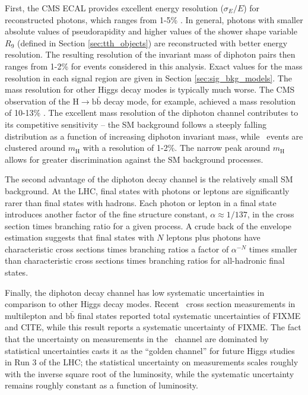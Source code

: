 First, the CMS ECAL provides excellent energy resolution ($\sigma_E/E$) for reconstructed photons, which ranges from 1-5\% \cite{Chatrchyan:2013dga}.
In general, photons with smaller absolute values of pseudorapidity and higher values of the shower shape variable $R_9$ (defined in Section \ref{sec:tth_objects}) are reconstructed with better energy resolution.
The resulting resolution of the invariant mass of diphoton pairs then ranges from 1-2\% for events considered in this analysis.
Exact values for the mass resolution in each signal region are given in Section \ref{sec:sig_bkg_models}.
The mass resolution for other Higgs decay modes is typically much worse.
The CMS observation of the $\text{H} \to \text{b}\bar{\text{b}}$ decay mode, for example, achieved a mass resolution of 10-13\% \cite{Hbb_obs}.
The excellent mass resolution of the diphoton channel contributes to its competitive sensitivity -- the SM background follows a steeply falling distribution as a function of increasing diphoton invariant mass, while \Hgg~events are clustered around $m_{\text{H}}$ with a resolution of 1-2\%.
The narrow peak around $m_{\text{H}}$ allows for greater discrimination against the SM background processes.


The second advantage of the diphoton decay channel is the relatively small SM background.
At the LHC, final states with photons or leptons are significantly rarer than final states with hadrons.
Each photon or lepton in a final state introduces another factor of the fine structure constant, $\alpha \approx 1/137$, in the cross section times branching ratio for a given process. 
A crude back of the envelope estimation suggests that final states with $N$ leptons plus photons have characteristic cross sections times branching ratios a factor of $\alpha^{-N}$ times smaller than characteristic cross sections times branching ratios for all-hadronic final states.


Finally, the diphoton decay channel has low systematic uncertainties in comparison to other Higgs decay modes.
Recent \ttH~cross section measurements in multilepton and $\text{b}\bar{\text{b}}$ final states reported total systematic uncertainties of FIXME and CITE, while this result reports a systematic uncertainty of FIXME.
The fact that the uncertainty on measurements in the \Hgg~channel are dominated by statistical uncertainties casts it as the ``golden channel'' for future Higgs studies in Run 3 of the LHC; the statistical uncertainty on measurements scales roughly with the inverse square root of the luminosity, while the systematic uncertainty remains roughly constant as a function of luminosity.
